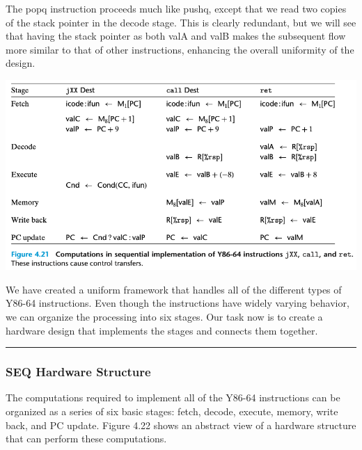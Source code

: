 \documentclass[11pt]{article}
\begin{document}
The popq instruction proceeds much like pushq, except that we read two copies of the stack pointer in the decode stage. This is clearly redundant, but we will see that having the stack pointer as both valA and valB makes the subsequent flow more similar to that of other instructions, enhancing the overall uniformity of the design.\\

\begin{center}
\includegraphics[width=.9\linewidth]{pics/figure4.21-computations-in-sequential-implementation-of-y86-64-instructions-jxx-call-ret.png}
\end{center}

We have created a uniform framework that handles all of the different types of Y86-64 instructions. Even though the instructions have widely varying behavior, we can organize the processing into six stages. Our task now is to create a hardware design that implements the stages and connects them together.\\

\noindent\rule{\textwidth}{0.5pt}


\subsubsection{SEQ Hardware Structure}
\label{sec:orgcde717e}
The computations required to implement all of the Y86-64 instructions can be organized as a series of six basic stages: fetch, decode, execute, memory, write back, and PC update. Figure 4.22 shows an abstract view of a hardware structure that can perform these computations.\\
\end{document}
